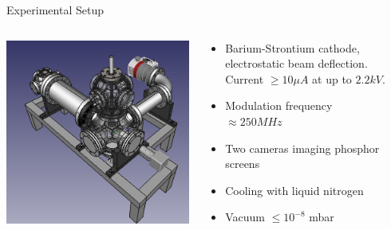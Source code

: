 \documentclass[final]{beamer}
\begin{document}
\begin{frame}[fragile]{}
\begin{columns}[T]
\begin{column}{.49\linewidth}
    \end{column}


    \begin{column}{.49\linewidth}
      \begin{block}{\Large Experimental Setup}
        \begin{columns}
          \begin{column}{0.4\columnwidth}
            \includegraphics[width=\columnwidth]{figures/cryoquak02.png}
          \end{column}
          \begin{column}{0.6\columnwidth}
              \begin{itemize}
                \item Barium-Strontium cathode, electrostatic beam deflection. Current $\geq 10 \mu A$ at
                    up to $2.2 kV$.
                \item Modulation frequency $\approx 250 MHz$
                \item Two cameras imaging phosphor screens
                \item Cooling with liquid nitrogen
                \item Vacuum $\leq 10^{-8}$ mbar
              \end{itemize}
          \end{column}
        \end{columns}
      \end{block}


\end{column}
\end{columns}
\end{frame}
\end{document}
